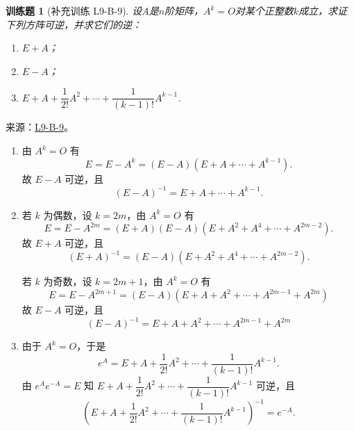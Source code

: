 \documentclass[UTF8,12pt,a4paper,fontset=fandol]{ctexart}
\newtheorem{exercise}{训练题}[section]
\begin{document}
\begin{exercise}[补充训练 L9-B-9]\label{prob:L9-B-9}
设$A$是$n$阶矩阵，$A^k=O$对某个正整数$k$成立，求证下列方阵可逆，并求它们的逆：
        \begin{enumerate}
            \item $E+A$；

            \item $E-A$；

            \item $E+A+\dfrac{1}{2!}A^2+\cdots+\dfrac{1}{(k-1)!}A^{k-1}$.
        \end{enumerate}
\end{exercise}
\noindent 来源：\href{https://github.com/yhwu-is/Linear-Algebra-Left-Undone/blob/new/%E8%AE%B2%E4%B9%89/%E4%B8%93%E9%A2%98/9%20%E7%9F%A9%E9%98%B5%E8%BF%90%E7%AE%97%E8%BF%9B%E9%98%B6.tex}{L9-B-9}。
\begin{solve}
\begin{enumerate}
                \item 由 $ A^k = O $ 有
                      \[ E = E - A^k = (E - A)(E + A + \cdots + A^{k - 1}). \]
                      故 $ E - A $ 可逆，且
                      \[ (E - A)^{-1} = E + A + \cdots + A^{k - 1}. \]

                \item 若 $ k $ 为偶数，设 $ k = 2m $，由 $ A^k = O $ 有
                      \[ E = E - A^{2m} = (E + A)(E - A)(E + A^2 + A^4 + \cdots + A^{2m - 2}). \]
                      故 $ E + A $ 可逆，且
                      \[ (E + A)^{-1} = (E - A)(E + A^2 + A^4 + \cdots + A^{2m - 2}). \]

                      若 $ k $ 为奇数，设 $ k = 2m + 1 $，由 $ A^k = O $ 有
                      \[ E = E - A^{2m + 1} = (E - A)(E + A + A^2 + \cdots + A^{2m - 1} + A^{2m}) \]
                      故 $ E - A $ 可逆，且
                      \[ (E - A)^{-1} = E + A + A^2 + \cdots + A^{2m - 1} + A^{2m} \]

                \item 由于 $ A^k = O $，于是
                      \[ e^A = E + A + \frac{1}{2!} A^2 + \cdots + \frac{1}{(k - 1)!} A^{k - 1}. \]
                      由 $ e^A e^{-A} = E $ 知 $ E + A + \dfrac{1}{2!} A^2 + \cdots + \dfrac{1}{(k - 1)!} A^{k - 1} $ 可逆，且
                      \[ (E + A + \frac{1}{2!} A^2 + \cdots + \frac{1}{(k - 1)!} A^{k - 1})^{-1} = e^{-A}. \]
            \end{enumerate}
\end{solve}
\end{document}
